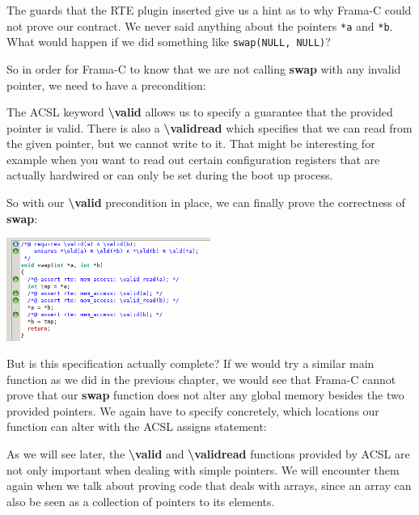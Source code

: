The guards that the RTE plugin inserted give us a hint as to why Frama-C could not prove our contract. We never said anything about the pointers \texttt{*a} and \texttt{*b}. What would happen if we did something like \texttt{swap(NULL, NULL)}?

So in order for Frama-C to know that we are not calling \textbf{swap} with any invalid pointer, we need to have a precondition:


The ACSL keyword \textbf{\textbackslash valid} allows us to specify a guarantee that the provided pointer is valid. There is also a \textbf{\textbackslash valid\textunderscore read} which specifies that we can read from the given pointer, but we cannot write to it. That might be interesting for example when you want to read out certain configuration registers that are actually hardwired or can only be set during the boot up process. 

So with our \textbf{\textbackslash valid} precondition in place, we can finally prove the correctness of \textbf{swap}:

\begin{center}
    \includegraphics[width=0.5\textwidth]{images/frama_c_swap_pre.png}
\end{center}

But is this specification actually complete? If we would try a similar main function as we did in the previous chapter, we would see that Frama-C cannot prove that our \textbf{swap} function does not alter any global memory besides the two provided pointers. We again have to specify concretely, which locations our function can alter with the ACSL assigns statement:


As we will see later, the \textbf{\textbackslash valid} and \textbf{\textbackslash valid\textunderscore read} functions provided by ACSL are not only important when dealing with simple pointers. We will encounter them again when we talk about proving code that deals with arrays, since an array can also be seen as a collection of pointers to its elements. 

